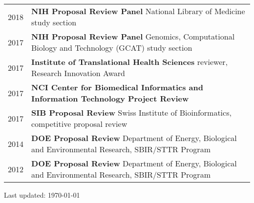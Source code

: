 \documentclass[11pt,fullpage]{article}
\begin{document}
\begin{longtable}{p{0.5in}|p{5.5in}}

  2018 & \textbf{NIH Proposal Review Panel} National Library of Medicine study section \\
  2017 & \textbf{NIH Proposal Review Panel} Genomics, Computational Biology and Technology (GCAT) study section \\
  2017 & \textbf{Institute of Translational Health Sciences} reviewer,
  Research Innovation Award \\
  2017 & \textbf{NCI Center for Biomedical Informatics and Information Technology Project Review} \\
  2017 & \textbf{SIB Proposal Review} Swiss Institute of Bioinformatics, competitive proposal review \\
  2014 & \textbf{DOE Proposal Review} Department of Energy, Biological and Environmental Research, SBIR/STTR Program \\
  2012 & \textbf{DOE Proposal Review} Department of Energy, Biological and Environmental Research, SBIR/STTR Program \\

\end{longtable}

  


\bigskip
\begin{center}
  \begin{footnotesize}
    Last updated: \today
  \end{footnotesize}
\end{center}

\end{document}
